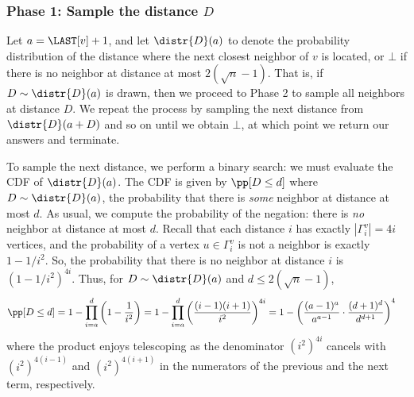 \subsubsection{Phase 1: Sample the distance $D$}
Let $a = \LAST[v] + 1$, and let $\distr{D}(a)$ to denote the probability distribution of the distance where the next closest neighbor of $v$ is located, or $\bot$ if there is no neighbor at distance at most $2(\sqrt{n}-1)$.
That is, if $D\sim\distr{D}(a)$ is drawn, then we proceed to Phase 2 to sample all neighbors at distance $D$.
We repeat the process by sampling the next distance from $\distr{D}(a+D)$ and so on until we obtain $\bot$, at which point we return our answers and terminate.

To sample the next distance, we perform a binary search: we must evaluate the CDF of $\distr{D}(a)$.
The CDF is given by $\pp[D\leq d]$ where $D\sim\distr{D}(a)$, the probability that there is \emph{some} neighbor at distance at most $d$.
As usual, we compute the probability of the negation: there is \emph{no} neighbor at distance at most $d$.
Recall that each distance $i$ has exactly $|\Gamma_i^v| = 4i$ vertices, and the probability of a vertex $u \in \Gamma_i^v$ is not a neighbor is exactly $1-1/i^2$.
So, the probability that there is no neighbor at distance $i$ is $(1-1/i^2)^{4i}$.
Thus, for $D\sim\distr{D}(a)$ and $d \leq 2(\sqrt{n}-1)$,
\begin{align*}
\pp[D\leq d] &= 1-\prod_{i=a}^{d} \left(1-\frac{1}{i^2}\right) = 1-\prod_{i=a}^{d} \left(\frac{(i-1)(i+1)}{i^2}\right)^{4i}
=1-\left(\frac{(a-1)^{a}}{a^{a-1}}\cdot\frac{(d+1)^{d}}{d^{d+1}}\right)^4
\end{align*}
where the product enjoys telescoping as the denominator $(i^2)^{4i}$ cancels with $(i^2)^{4(i-1)}$ and $(i^2)^{4(i+1)}$ in the numerators of the previous and the next term, respectively.
\iffalse
